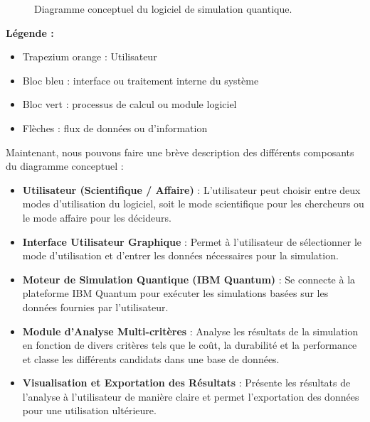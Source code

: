 \documentclass[11pt]{article}
\begin{document}
\begin{figure}[htbp]
\centering
{}
\caption{Diagramme conceptuel du logiciel de simulation quantique.}
\end{figure}

\newpage

\textbf{Légende :}
\begin{itemize}
    \item Trapezium orange : Utilisateur
    \item Bloc bleu : interface ou traitement interne du système
    \item Bloc vert : processus de calcul ou module logiciel
    \item Flèches : flux de données ou d’information
\end{itemize}

Maintenant, nous pouvons faire une brève description des différents composants du diagramme conceptuel :
\begin{itemize}
  \item \textbf{Utilisateur (Scientifique / Affaire)} : L'utilisateur peut choisir entre deux modes d'utilisation du logiciel, soit le mode scientifique pour les chercheurs ou le mode affaire pour les décideurs.
  \item \textbf{Interface Utilisateur Graphique} : Permet à l'utilisateur de sélectionner le mode d'utilisation et d'entrer les données nécessaires pour la simulation.
  \item \textbf{Moteur de Simulation Quantique (IBM Quantum)} : Se connecte à la plateforme IBM Quantum pour exécuter les simulations basées sur les données fournies par l'utilisateur.
  \item \textbf{Module d’Analyse Multi-critères} : Analyse les résultats de la simulation en fonction de divers critères tels que le coût, la durabilité et la performance et classe les différents candidats dans une base de données.
  \item \textbf{Visualisation et Exportation des Résultats} : Présente les résultats de l'analyse à l'utilisateur de manière claire et permet l'exportation des données pour une utilisation ultérieure.
\end{itemize}
\end{document}
